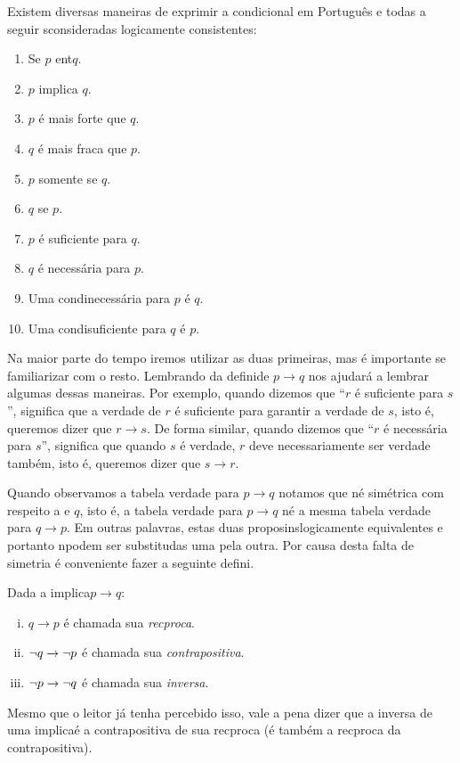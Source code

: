 Existem diversas maneiras de exprimir a condicional em Portugu\^es e todas a seguir s\ao consideradas logicamente consistentes:
\begin{enumerate}[{\bf a)}]
\item Se $p$ ent\ao $q$.
\item $p$ implica $q$.
\item $p$ \'e mais forte que $q$.
\item $q$ \'e mais fraca que $p$.
\item $p$ somente se $q$.
\item $q$ se $p$.
\item $p$ \'e suficiente para $q$.
\item $q$ \'e necess\'aria para $p$.
\item Uma condi\cao necess\'aria para $p$ \'e $q$.
\item Uma condi\cao suficiente para $q$ \'e $p$.
\end{enumerate}
Na maior parte do tempo iremos utilizar as duas primeiras, mas \'e importante se familiarizar com o resto. Lembrando da defini\cao de $p \to q$ nos ajudar\'a a lembrar algumas dessas maneiras. Por exemplo, quando dizemos que ``$r$ \'e suficiente para $s$'', significa que a verdade de $r$ \'e suficiente para garantir a verdade de $s$, isto \'e, queremos dizer que $r \to s$. De forma similar, quando dizemos que ``$r$ \'e necess\'aria para $s$'', significa que quando $s$ \'e verdade, $r$ deve necessariamente ser verdade tamb\'em, isto \'e, queremos dizer que $s\to r$. 

Quando observamos a tabela verdade para $p \to q$ notamos que n\ao \'e sim\'etrica com respeito a \pp e $q$, isto \'e, a tabela verdade para $p \to q$ n\ao \'e a mesma tabela verdade para $q\to p$. Em outras palavras, estas duas proposi\coes n\ao s\ao logicamente equivalentes e portanto n\ao podem ser substitu\ih das uma pela outra. Por causa desta falta de simetria \'e conveniente fazer a seguinte defini\caoi.

Dada a implica\cao $p \to q$:
\begin{enumerate}[i)]
\item $q \to p$ \'e chamada sua {\it rec\ih proca}. 
\item $\lnot q \to \lnot p$ \'e chamada sua {\it contrapositiva}. 
\item $\lnot p \to \lnot q$ \'e chamada sua {\it inversa}. 
\end{enumerate}
Mesmo que o leitor j\'a tenha percebido isso, vale a pena dizer que a inversa de uma implica\cao \'e a contrapositiva de sua rec\ih proca (\'e tamb\'em a rec\ih proca da contrapositiva).

